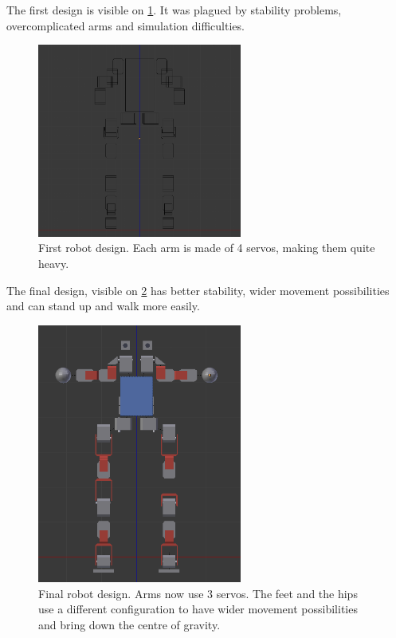 The first design is visible on \cref{fig:first_robot}. It was plagued by stability problems, overcomplicated arms and simulation difficulties. 
\begin{figure}[htp]
\center
\includegraphics[width=0.6\textwidth]{figures/robot1}
\caption[Initial robot design]{First robot design. Each arm is made of 4 servos, making them quite heavy.}
\label{fig:first_robot}
\end{figure}

The final design, visible on \cref{fig:final_robot} has better stability, wider movement possibilities and can stand up and walk more easily. 
\begin{figure}[htp]
\center
\includegraphics[width=0.6\textwidth]{figures/robot2}
\caption[Final robot design]{Final robot design. Arms now use 3 servos. The feet and the hips use a different configuration to have wider movement possibilities and bring down the centre of gravity.}
\label{fig:final_robot}
\end{figure}

